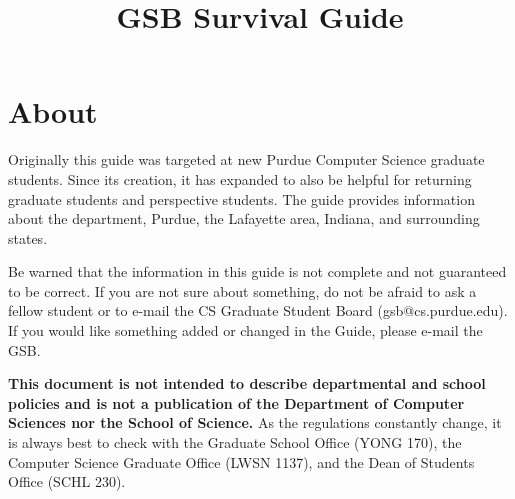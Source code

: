 \documentclass[letterpaper,twocolumn,10pt]{article}
\begin{document}
\date{}

\title{GSB Survival Guide}

\maketitle

\section*{About}
Originally this guide was targeted at new Purdue Computer Science graduate students. Since its creation, it has expanded to also be helpful for returning graduate students and perspective students. The guide provides information about the department, Purdue, the Lafayette area, Indiana, and surrounding states.

Be warned that the information in this guide is not complete and not guaranteed to be correct. If you are not sure about something, do not be afraid to ask a fellow student or to e-mail the CS Graduate Student Board (gsb@cs.purdue.edu). If you would like something added or changed in the Guide, please e-mail the GSB.

\textbf{This document is not intended to describe departmental and school policies and is not a publication of the Department of Computer Sciences nor the School of Science.} As the regulations constantly change, it is always best to check with the Graduate School Office (YONG 170), the Computer Science Graduate Office (LWSN 1137), and the Dean of Students Office (SCHL 230).
\end{document}

